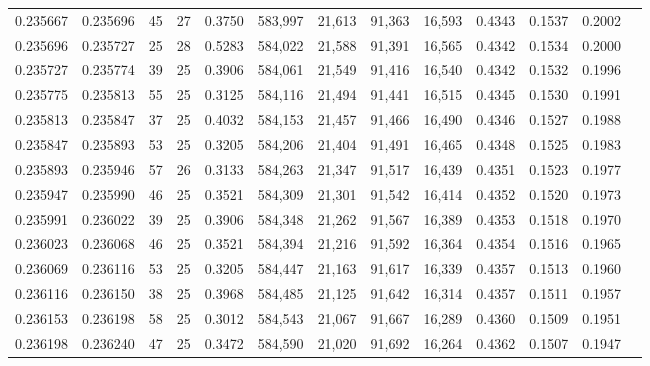 \begin{tabular}{rrrrrrrrrrrrr}
0.235667 & 0.235696 &    45 &  27 &                                     0.3750 & 583,997 &  21,613 &  91,363 &  16,593 & 0.4343 & 0.1537 & 0.2002 \\
0.235696 & 0.235727 &    25 &  28 &                                     0.5283 & 584,022 &  21,588 &  91,391 &  16,565 & 0.4342 & 0.1534 & 0.2000 \\
0.235727 & 0.235774 &    39 &  25 &                                     0.3906 & 584,061 &  21,549 &  91,416 &  16,540 & 0.4342 & 0.1532 & 0.1996 \\
0.235775 & 0.235813 &    55 &  25 &                                     0.3125 & 584,116 &  21,494 &  91,441 &  16,515 & 0.4345 & 0.1530 & 0.1991 \\
0.235813 & 0.235847 &    37 &  25 &                                     0.4032 & 584,153 &  21,457 &  91,466 &  16,490 & 0.4346 & 0.1527 & 0.1988 \\
0.235847 & 0.235893 &    53 &  25 &                                     0.3205 & 584,206 &  21,404 &  91,491 &  16,465 & 0.4348 & 0.1525 & 0.1983 \\
0.235893 & 0.235946 &    57 &  26 &                                     0.3133 & 584,263 &  21,347 &  91,517 &  16,439 & 0.4351 & 0.1523 & 0.1977 \\
0.235947 & 0.235990 &    46 &  25 &                                     0.3521 & 584,309 &  21,301 &  91,542 &  16,414 & 0.4352 & 0.1520 & 0.1973 \\
0.235991 & 0.236022 &    39 &  25 &                                     0.3906 & 584,348 &  21,262 &  91,567 &  16,389 & 0.4353 & 0.1518 & 0.1970 \\
0.236023 & 0.236068 &    46 &  25 &                                     0.3521 & 584,394 &  21,216 &  91,592 &  16,364 & 0.4354 & 0.1516 & 0.1965 \\
0.236069 & 0.236116 &    53 &  25 &                                     0.3205 & 584,447 &  21,163 &  91,617 &  16,339 & 0.4357 & 0.1513 & 0.1960 \\
0.236116 & 0.236150 &    38 &  25 &                                     0.3968 & 584,485 &  21,125 &  91,642 &  16,314 & 0.4357 & 0.1511 & 0.1957 \\
0.236153 & 0.236198 &    58 &  25 &                                     0.3012 & 584,543 &  21,067 &  91,667 &  16,289 & 0.4360 & 0.1509 & 0.1951 \\
0.236198 & 0.236240 &    47 &  25 &                                     0.3472 & 584,590 &  21,020 &  91,692 &  16,264 & 0.4362 & 0.1507 & 0.1947 \\

\end{tabular}
